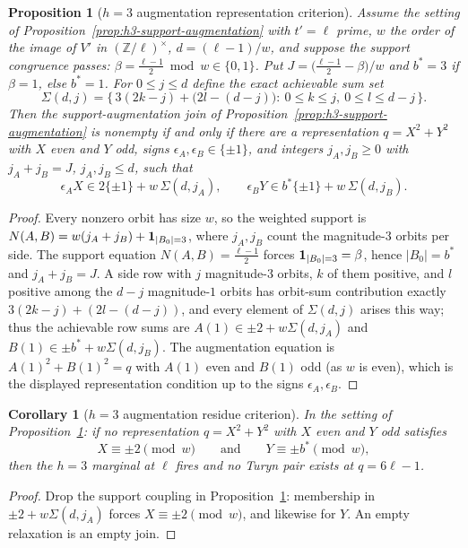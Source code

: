 \documentclass[11pt]{article}
\theoremstyle{plain}
\newtheorem{proposition}[theorem]{Proposition}
\newtheorem{corollary}[theorem]{Corollary}
\theoremstyle{definition}
\theoremstyle{remark}
\newcommand{\Z}{\mathbb Z}
\begin{document}
\begin{proposition}[$h=3$ augmentation representation criterion]
\label{prop:h3-augmentation-reps}
Assume the setting of Proposition~\ref{prop:h3-support-augmentation} with
$t'=\ell$ prime, $w$ the order of the image of $V'$ in
$(\Z/\ell)^\times$, $d=(\ell-1)/w$, and suppose the support congruence
passes: $\beta=\frac{\ell-1}2\bmod w\in\{0,1\}$.  Put
$J=\bigl(\frac{\ell-1}2-\beta\bigr)/w$ and $b^*=3$ if $\beta=1$, else
$b^*=1$.  For $0\le j\le d$ define the exact achievable sum set
\[
  \Sigma(d,j)=\bigl\{\,3(2k-j)+\bigl(2l-(d-j)\bigr):\
  0\le k\le j,\ 0\le l\le d-j\,\bigr\}.
\]
Then the support-augmentation join of
Proposition~\ref{prop:h3-support-augmentation} is nonempty if and only if
there are a representation $q=X^2+Y^2$ with $X$ even and $Y$ odd, signs
$\epsilon_A,\epsilon_B\in\{\pm1\}$, and integers $j_A,j_B\ge0$ with
$j_A+j_B=J$, $j_A,j_B\le d$, such that
\[
  \epsilon_A X\in 2\{\pm1\}+w\,\Sigma(d,j_A),\qquad
  \epsilon_B Y\in b^*\{\pm1\}+w\,\Sigma(d,j_B).
\]
\end{proposition}

\begin{proof}
Every nonzero orbit has size $w$, so the weighted support is
$N(A,B)=w(j_A+j_B)+{\bf1}_{|B_0|=3}$, where $j_A,j_B$ count the
magnitude-$3$ orbits per side.  The support equation
$N(A,B)=\frac{\ell-1}2$ forces ${\bf1}_{|B_0|=3}=\beta$, hence
$|B_0|=b^*$ and $j_A+j_B=J$.  A side row with $j$ magnitude-$3$ orbits,
$k$ of them positive, and $l$ positive among the $d-j$ magnitude-$1$
orbits has orbit-sum contribution exactly $3(2k-j)+(2l-(d-j))$, and every
element of $\Sigma(d,j)$ arises this way; thus the achievable row sums
are $A(1)\in\pm2+w\Sigma(d,j_A)$ and $B(1)\in\pm b^*+w\Sigma(d,j_B)$.
The augmentation equation is $A(1)^2+B(1)^2=q$ with $A(1)$ even and
$B(1)$ odd (as $w$ is even), which is the displayed representation
condition up to the signs $\epsilon_A,\epsilon_B$.
\end{proof}

\begin{corollary}[$h=3$ augmentation residue criterion]
\label{cor:h3-augmentation-residue}
In the setting of Proposition~\ref{prop:h3-augmentation-reps}: if no
representation $q=X^2+Y^2$ with $X$ even and $Y$ odd satisfies
\[
  X\equiv\pm2\pmod w
  \qquad\text{and}\qquad
  Y\equiv\pm b^*\pmod w,
\]
then the $h=3$ marginal at $\ell$ fires and no Turyn pair exists at
$q=6\ell-1$.
\end{corollary}

\begin{proof}
Drop the support coupling in Proposition~\ref{prop:h3-augmentation-reps}:
membership in $\pm2+w\Sigma(d,j_A)$ forces $X\equiv\pm2\pmod w$, and
likewise for $Y$.  An empty relaxation is an empty join.
\end{proof}
\end{document}
